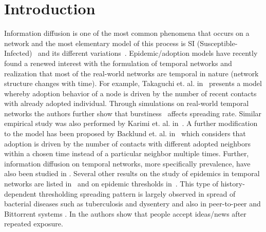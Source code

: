 \noindent
\section{Introduction}
Information diffusion is one of the most common phenomena that occurs on a
network and the most elementary model of this process is SI
(Susceptible-Infected)~\cite{anderson1992infectious} and its different variations~\cite{watts2002simple,dodds2004universal,pnas1,pnas2,tang2009epidemic,son2012percolation}.
Epidemic/adoption models have recently found a renewed interest with the formulation of temporal networks and 
realization that most of the real-world networks are temporal in nature (network structure changes with time). 
For example,  Takaguchi et. al. in~\cite{takaguchi2013bursty} presents a model whereby adoption behavior 
of a node is driven by the number of recent contacts with already adopted individual. 
Through simulations on real-world temporal networks the authors further show that burstiness~\cite{karsai2011small} 
affects spreading rate. Similar empirical study was also performed by Karimi et. al. in~\cite{karimi2013threshold}. A further modification to the 
model has been proposed by Backlund et. al. in~\cite{backlund2014effects} which considers that adoption is driven by the number of contacts
with different adopted neighbors within a chosen time instead of a particular neighbor multiple times. Further, information diffusion on temporal 
networks, more specifically prevalence, have also been studied in \cite{rocha2013bursts}. 
Several other results on the study of 
epidemics in temporal networks are listed in~\cite{masuda2013predicting} and on epidemic thresholds in~\cite{prl1,van2012epidemic,zhang2014susceptible}.
This type of history-dependent thresholding spreading pattern is largely observed in spread of bacterial diseases such as tuberculosis and 
dysentery \cite{joh2009dynamics} and 
also in peer-to-peer \cite{sanghavi2007gossiping} and Bittorrent systems \cite{qiu2004modeling}. In \cite{romero2011differences} the authors show that people 
accept ideas/news after repeated exposure.
\fi

